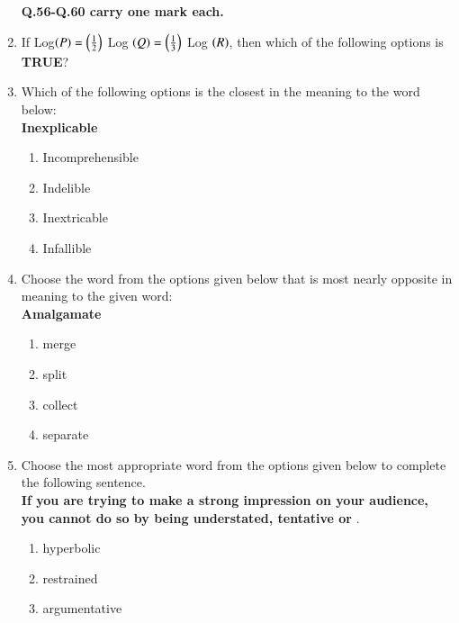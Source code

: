 \documentclass[journal]{IEEEtran}
\begin{document}
\begin{enumerate}[start=53]
\textbf{Q.56-Q.60 carry one mark each.}\\
\item If Log$\left(P\right)=\left(\frac{1}{2}\right)$ Log $\left(Q\right)=\left(\frac{1}{3}\right)$ Log $\left(R\right)$, then which of the following options is \textbf{TRUE}?
\begin{enumerate}
\end{enumerate}

\item Which of the following options is the closest in the meaning to the word below:\\
\textbf{Inexplicable}\\
\begin{enumerate}
    \item Incomprehensible
    \item Indelible
    \item Inextricable
    \item Infallible
\end{enumerate}
\item Choose the word from the options given below that is most nearly opposite in meaning to the given word:\\
\textbf{Amalgamate}\\
\begin{enumerate}
    \item merge
    \item split
    \item collect
    \item separate
\end{enumerate}
\item Choose the most appropriate word from the options given below to complete the following sentence.\\
\textbf{If you are trying to make a strong impression on your audience, you cannot do so by being understated, tentative or} \underline{\hspace{1cm}}.\\
\begin{enumerate}
    \item hyperbolic
    \item restrained
    \item argumentative

\end{enumerate}
\end{enumerate}
\end{document}
